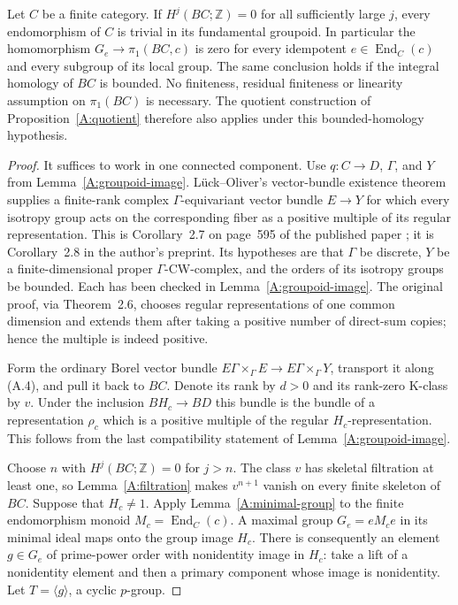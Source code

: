 \begin{theorem}\label{A:bounded-categories}
Let $C$ be a finite category. If $H^j(BC;\mathbb Z)=0$ for all sufficiently
large $j$, every endomorphism of $C$ is trivial in its fundamental groupoid.
In particular the homomorphism
$G_e\to\pi_1(BC,c)$ is zero for every idempotent
$e\in\operatorname{End}_C(c)$ and every subgroup of its local group.
The same conclusion holds if the integral homology of $BC$ is bounded.
No finiteness, residual finiteness or linearity assumption on $\pi_1(BC)$
is necessary. The quotient construction of Proposition~\ref{A:quotient}
therefore also applies under this bounded-homology hypothesis.
\end{theorem}
\begin{proof}
It suffices to work in one connected component. Use $q:C\to D$,
$\Gamma$, and $Y$ from Lemma~\ref{A:groupoid-image}.
L\"uck--Oliver's vector-bundle existence theorem supplies a finite-rank
complex $\Gamma$-equivariant vector bundle $E\to Y$ for which every
isotropy group acts on the corresponding fiber as a positive multiple
of its regular representation. This is Corollary~2.7 on page~595 of the
published paper \cite{luckoliver2001}; it is Corollary~2.8 in the author's
preprint. Its hypotheses are that $\Gamma$ be discrete, $Y$ be a
finite-dimensional proper $\Gamma$-CW-complex, and the orders of its
isotropy groups be bounded. Each has been checked in
Lemma~\ref{A:groupoid-image}. The original proof, via Theorem~2.6,
chooses regular representations of one common dimension and extends
them after taking a positive number of direct-sum copies; hence the
multiple is indeed positive.

Form the ordinary Borel vector bundle
$E\Gamma\times_\Gamma E\to E\Gamma\times_\Gamma Y$, transport it
along (A.4), and pull it back to $BC$. Denote its rank by $d>0$ and its
rank-zero K-class by $v$. Under the inclusion $BH_c\to BD$ this bundle
is the bundle of a representation $\rho_c$ which is a positive multiple
of the regular $H_c$-representation. This follows from the last
compatibility statement of Lemma~\ref{A:groupoid-image}.

Choose $n$ with $H^j(BC;\mathbb Z)=0$ for $j>n$. The class $v$ has
skeletal filtration at least one, so Lemma~\ref{A:filtration} makes
$v^{n+1}$ vanish on every finite skeleton of $BC$.
Suppose that $H_c\ne1$. Apply Lemma~\ref{A:minimal-group} to the finite
endomorphism monoid $M_c=\operatorname{End}_C(c)$. A maximal group
$G_e=eM_ce$ in its minimal ideal maps onto the group image $H_c$.
There is consequently an element $g\in G_e$ of prime-power order with
nonidentity image in $H_c$: take a lift of a nonidentity element and then
a primary component whose image is nonidentity. Let $T=\langle g\rangle$,
a cyclic $p$-group.


\end{proof}
